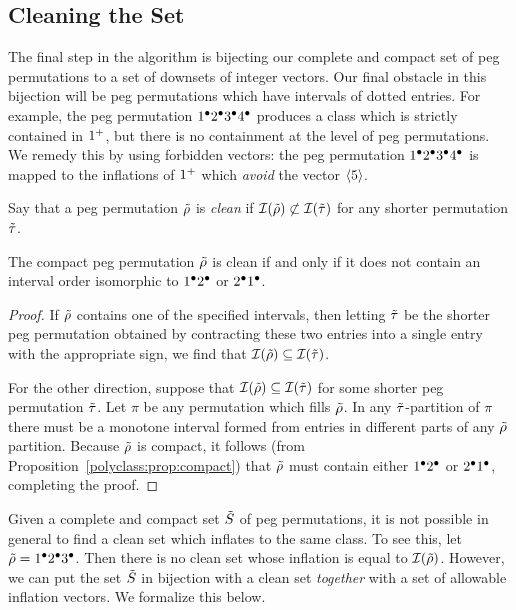   \subsection{Cleaning the Set}

    The final step in the algorithm is bijecting our complete and compact set
    of peg permutations to a set of downsets of integer vectors. Our final
    obstacle in this bijection will be peg permutations which have intervals of
    dotted entries. For example, the peg permutation $1^\bullet 2^\bullet 3^\bullet 4^\bullet$
    produces a class which is strictly contained in $1^+$, but there is no
    containment at the level of peg permutations. We remedy this by using
    forbidden vectors: the peg permutation $1^\bullet 2^\bullet 3^\bullet 4^\bullet$ is mapped to
    the inflations of $1^+$ which \emph{avoid} the vector $\left\langle 5 \right\rangle$. 

    \begin{definition} \label{polyclass:def:clean}
      Say that a peg permutation $\tilde{\rho}$ is \emph{clean} if $\mathcal{I}(\tilde{\rho}) \not
      \subset \mathcal{I}(\tilde{\tau})$ for any shorter permutation $\tilde{\tau}$. 
    \end{definition}

    \begin{proposition}\label{polyclass:prop:clean}
      The compact peg permutation $\tilde{\rho}$ is clean if and only if it does not
      contain an interval order isomorphic to $1^\bullet 2^\bullet$ or $2^\bullet 1^\bullet$. 
    \end{proposition}
    \begin{proof}
      If $\tilde{\rho}$ contains one of the specified intervals, then letting $\tilde{\tau}$ be
      the shorter peg permutation obtained by contracting these two entries
      into a single entry with the appropriate sign, we find that $\mathcal{I}(\tilde{\rho})
      \subseteq \mathcal{I}(\tilde{\tau})$. 

      For the other direction, suppose that $\mathcal{I}(\tilde{\rho}) \subseteq \mathcal{I}(\tilde{\tau})$ for
      some shorter peg permutation $\tilde{\tau}$. Let $\pi$ be any permutation which
      fills $\tilde{\rho}$. In any $\tilde{\tau}$-partition of $\pi$ there must be a monotone
      interval formed from entries in different parts of any $\tilde{\rho}$ partition.
      Because $\tilde{\rho}$ is compact, it follows (from
      Proposition~\ref{polyclass:prop:compact}) that $\tilde{\rho}$ must contain either
      $1^\bullet 2^\bullet$ or $2^\bullet 1^\bullet$, completing the proof.
    \end{proof}

    Given a complete and compact set $\tilde{S}$ of peg permutations, it is not
    possible in general to find a clean set which inflates to the same class.
    To see this, let $\tilde{\rho} = 1^\bullet 2^\bullet 3^\bullet$. Then there is no clean set
    whose inflation is equal to $\mathcal{I}(\tilde{\rho})$. However, we can put the set $\tilde{S}$
    in bijection with a clean set \emph{together} with a set of allowable
    inflation vectors. We formalize this below. 

